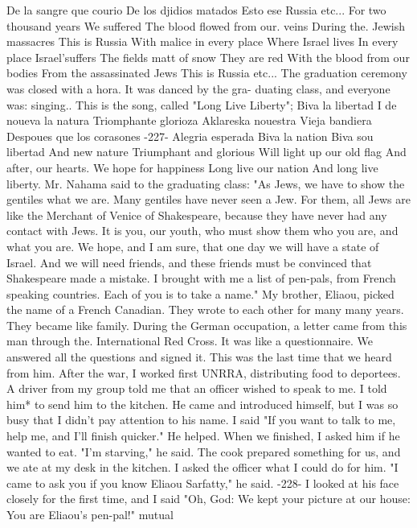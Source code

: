 De la sangre que courio 
De los djidios matados 
Esto ese Russia 
etc... 
For two thousand years 
We suffered 
The blood flowed from our.
veins 
During the.
Jewish massacres 
This is Russia 
With malice in every place 
Where Israel lives 
In every place 
Israel'suffers 
The fields matt of snow 
They are red 
With the blood from our bodies 
From the assassinated Jews 
This is Russia 
etc... 
The graduation ceremony was closed with a hora.
It was danced by the gra-
duating class, and everyone was: singing.. This is the song, called "Long 
Live Liberty"; 
Biva la libertad 
I de noueva la natura 
Triomphante glorioza 
Aklareska nouestra 
Vieja bandiera 
Despoues que los corasones 
-227- 
Alegria esperada 
Biva la nation 
Biva sou libertad 
And new nature 
Triumphant and glorious 
Will light up our old flag 
And after, our hearts.
We hope for happiness 
Long live our nation 
And long live liberty.
Mr.
Nahama said to the graduating class: "As Jews, we have to show the 
gentiles what we are.
Many gentiles have never seen a Jew.
For them, 
all Jews are like the Merchant of Venice of Shakespeare, because 
they have never had any contact with Jews.
It is you, our youth, who 
must show them who you are, and what you are.
We hope, and I am sure, 
that one day we will have a state of Israel.
And we will need friends, 
and these friends must be convinced that Shakespeare made a mistake.
I 
brought with me a list of pen-pals, from French speaking countries.
Each
of you is to take a name."
My brother, Eliaou, picked the name of a French Canadian.
They 
wrote to each other for many many years.
They became like family.
During the German occupation, a letter came from this man through the.
International Red Cross.
It was like a questionnaire.
We answered all the 
questions and signed it.
This was the last time that we heard from him.
After the war, I worked first UNRRA, distributing food to deportees.
A 
driver from my group told me that an officer wished to speak to me.
I 
told him* to send him to the kitchen.
He came and introduced himself, 
but I was so busy that I didn't pay attention to his name.
I said "If 
you want to talk to me, help me, and I'll finish quicker."
He helped.
When we finished, I asked him if he wanted to eat.
"I'm starving," he said.
The cook prepared something for us, and we ate at my desk in the 
kitchen.
I asked the officer what I could do for him.
"I came to ask you if you know Eliaou Sarfatty," he said.
-228- 
I looked at his face closely for the first time, and I said "Oh, 
God: We kept your picture at our house: You are Eliaou's pen-pal!"
mutual 
